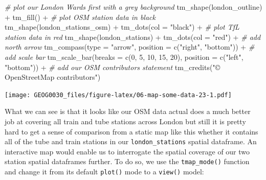 \documentclass[
]{book}
\newenvironment{Shaded}{\begin{snugshade}}{\end{snugshade}}
\newcommand{\AttributeTok}[1]{\textcolor[rgb]{0.77,0.63,0.00}{#1}}
\newcommand{\CommentTok}[1]{\textcolor[rgb]{0.56,0.35,0.01}{\textit{#1}}}
\newcommand{\DecValTok}[1]{\textcolor[rgb]{0.00,0.00,0.81}{#1}}
\newcommand{\FunctionTok}[1]{\textcolor[rgb]{0.00,0.00,0.00}{#1}}
\newcommand{\NormalTok}[1]{#1}
\newcommand{\SpecialCharTok}[1]{\textcolor[rgb]{0.00,0.00,0.00}{#1}}
\newcommand{\StringTok}[1]{\textcolor[rgb]{0.31,0.60,0.02}{#1}}
\begin{document}
\begin{Shaded}
\begin{Highlighting}[]
\CommentTok{\# plot our London Wards first with a grey background}
\FunctionTok{tm\_shape}\NormalTok{(london\_outline) }\SpecialCharTok{+} \FunctionTok{tm\_fill}\NormalTok{() }\SpecialCharTok{+}
  \CommentTok{\# plot OSM station data in black}
  \FunctionTok{tm\_shape}\NormalTok{(london\_stations\_osm) }\SpecialCharTok{+} \FunctionTok{tm\_dots}\NormalTok{(}\AttributeTok{col =} \StringTok{"black"}\NormalTok{) }\SpecialCharTok{+}
  \CommentTok{\# plot TfL station data in red}
  \FunctionTok{tm\_shape}\NormalTok{(london\_stations) }\SpecialCharTok{+} \FunctionTok{tm\_dots}\NormalTok{(}\AttributeTok{col =} \StringTok{"red"}\NormalTok{) }\SpecialCharTok{+}
  \CommentTok{\# add north arrow}
  \FunctionTok{tm\_compass}\NormalTok{(}\AttributeTok{type =} \StringTok{"arrow"}\NormalTok{, }\AttributeTok{position =} \FunctionTok{c}\NormalTok{(}\StringTok{"right"}\NormalTok{, }\StringTok{"bottom"}\NormalTok{)) }\SpecialCharTok{+}
  \CommentTok{\# add scale bar}
  \FunctionTok{tm\_scale\_bar}\NormalTok{(}\AttributeTok{breaks =} \FunctionTok{c}\NormalTok{(}\DecValTok{0}\NormalTok{, }\DecValTok{5}\NormalTok{, }\DecValTok{10}\NormalTok{, }\DecValTok{15}\NormalTok{, }\DecValTok{20}\NormalTok{), }\AttributeTok{position =} \FunctionTok{c}\NormalTok{(}\StringTok{"left"}\NormalTok{, }\StringTok{"bottom"}\NormalTok{)) }\SpecialCharTok{+}
  \CommentTok{\# add our OSM contributors statement}
  \FunctionTok{tm\_credits}\NormalTok{(}\StringTok{"© OpenStreetMap contributors"}\NormalTok{)}
\end{Highlighting}
\end{Shaded}

\texttt{[image: GEOG0030\_files/figure-latex/06-map-some-data-23-1.pdf]}

What we can see is that it looks like our OSM data actual does a much better job at covering all train and tube stations across London but still it is pretty hard to get a sense of comparison from a static map like this whether it contains all of the tube and train stations in our \texttt{london\_stations} spatial dataframe. An interactive map would enable us to interrogate the spatial coverage of our two station spatial dataframes further. To do so, we use the \texttt{tmap\_mode()} function and change it from its default \texttt{plot()} mode to a \texttt{view()} model:
\end{document}
